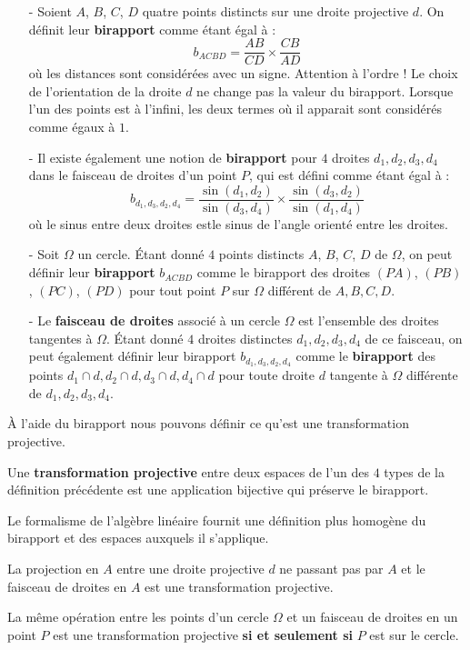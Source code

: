 \begin{dfn}
\begin{itemize}
\item[-] Soient $A$, $B$, $C$, $D$ quatre points distincts sur une droite projective $d$. On définit leur \textbf{birapport} comme étant égal à :
$$b_{ACBD} = \frac{AB}{CD} \times \frac{CB}{AD}$$
où les distances sont considérées avec un signe. Attention à l'ordre ! Le choix de l'orientation de la droite $d$ ne change pas la valeur du birapport. Lorsque l'un des points est à l'infini, les deux termes où il apparait sont considérés comme égaux à $1$.
\item[-] Il existe également une notion de \textbf{birapport} pour $4$ droites $d_1, d_2, d_3, d_4$ dans le faisceau de droites d'un point $P$, qui est défini comme étant égal à :
$$b_{d_1, d_3, d_2, d_4} = \frac{\sin(d_1, d_2)}{\sin(d_3, d_4)}\times\frac{\sin(d_3, d_2)}{\sin(d_1, d_4)}$$
où le sinus entre deux droites estle sinus de l'angle orienté entre les droites.
\item[-] Soit $\Omega$ un cercle. Étant donné $4$ points distincts $A$, $B$, $C$, $D$ de $\Omega$, on peut définir leur \textbf{birapport} $b_{ACBD}$ comme le birapport des droites $(PA)$, $(PB)$, $(PC)$, $(PD)$ pour tout point $P$ sur $\Omega$ différent de $A, B, C, D$.
\item[-]Le \textbf{faisceau de droites} associé à un cercle $\Omega$ est l'ensemble des droites tangentes à $\Omega$. Étant donné $4$ droites distinctes $d_1, d_2, d_3, d_4$ de ce faisceau, on peut également définir leur birapport $b_{d_1, d_3, d_2, d_4}$ comme le \textbf{birapport} des points $d_1\cap d, d_2\cap d, d_3\cap d, d_4\cap d$ pour toute droite $d$ tangente à $\Omega$ différente de $d_1, d_2, d_3, d_4$.
\end{itemize}
\end{dfn}


À l'aide du birapport nous pouvons définir ce qu'est une transformation projective.


\begin{dfn}
Une \textbf{transformation projective} entre deux espaces de l'un des $4$ types de la définition précédente est une application bijective qui préserve le birapport.
\end{dfn}


Le formalisme de l'algèbre linéaire fournit une définition plus homogène du birapport et des espaces auxquels il s'applique.


\begin{pro}
La projection en $A$ entre une droite projective $d$ ne passant pas par $A$ et le faisceau de droites en $A$ est une transformation projective.

\smallskip

La même opération entre les points d'un cercle $\Omega$ et un faisceau de droites en un point $P$ est une transformation projective \textbf{si et seulement si} $P$ est sur le cercle.
\end{pro}
\medskip

